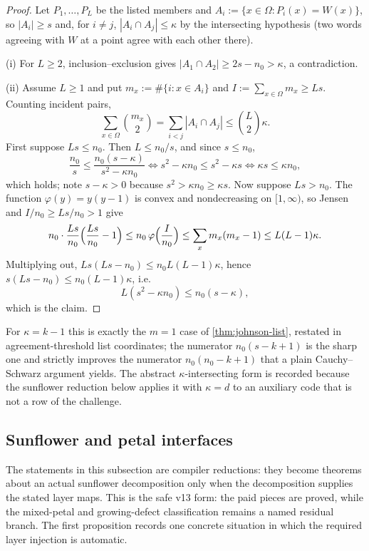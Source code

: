 \begin{proof}
Let $P_1,\ldots,P_L$ be the listed members and $A_i:=\{x\in\Omega:P_i(x)=W(x)\}$, so $|A_i|\ge s$ and, for $i\ne j$, $|A_i\cap A_j|\le\kappa$ by the intersecting hypothesis \textup(two words agreeing with $W$ at a point agree with each other there\textup).

\textup{(i)}  For $L\ge2$, inclusion--exclusion gives $|A_1\cap A_2|\ge2s-n_0>\kappa$, a contradiction.

\textup{(ii)}  Assume $L\ge1$ and put $m_x:=\#\{i:x\in A_i\}$ and $I:=\sum_{x\in\Omega}m_x\ge Ls$.  Counting incident pairs,
\[
        \sum_{x\in\Omega}\binom{m_x}2=\sum_{i<j}|A_i\cap A_j|\le\binom L2\kappa .
\]
First suppose $Ls\le n_0$.  Then $L\le n_0/s$, and since $s\le n_0$,
\[
        \frac{n_0}s\le\frac{n_0(s-\kappa)}{s^2-\kappa n_0}
        \iff
        s^2-\kappa n_0\le s^2-\kappa s
        \iff
        \kappa s\le\kappa n_0,
\]
which holds; note $s-\kappa>0$ because $s^2>\kappa n_0\ge\kappa s$.  Now suppose $Ls>n_0$.  The function $\varphi(y)=y(y-1)$ is convex and nondecreasing on $[1,\infty)$, so Jensen and $I/n_0\ge Ls/n_0>1$ give
\[
        n_0\cdot\frac{Ls}{n_0}\Bigl(\frac{Ls}{n_0}-1\Bigr)
        \le
        n_0\,\varphi\Bigl(\frac I{n_0}\Bigr)
        \le
        \sum_x m_x(m_x-1)
        \le
        L(L-1)\kappa .
\]
Multiplying out, $Ls(Ls-n_0)\le n_0L(L-1)\kappa$, hence $s(Ls-n_0)\le n_0(L-1)\kappa$, i.e.
\[
        L(s^2-\kappa n_0)\le n_0(s-\kappa),
\]
which is the claim.
\end{proof}

\begin{remark}\label{rem:v13-johnson-v12}
For $\kappa=k-1$ this is exactly the $m=1$ case of \cref{thm:johnson-list}, restated in agreement-threshold list coordinates; the numerator $n_0(s-k+1)$ is the sharp one and strictly improves the numerator $n_0(n_0-k+1)$ that a plain Cauchy--Schwarz argument yields.  The abstract $\kappa$-intersecting form is recorded because the sunflower reduction below applies it with $\kappa=d$ to an auxiliary code that is not a row of the challenge.
\end{remark}

\subsection{Sunflower and petal interfaces}

The statements in this subsection are compiler reductions: they become theorems about an actual sunflower decomposition only when the decomposition supplies the stated layer maps.  This is the safe v13 form: the paid pieces are proved, while the mixed-petal and growing-defect classification remains a named residual branch.  The first proposition records one concrete situation in which the required layer injection is automatic.

